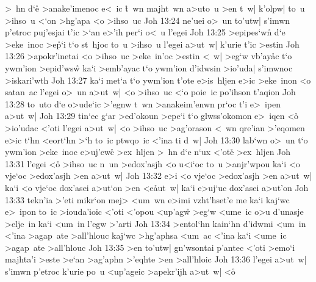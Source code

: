 >~hn
d`e\r{}
>anake'imenoc
e<~ic
\r{t}~wn
majht~wn
a>uto~u
>en
t~w|
k'olpw|
to~u
>ihso~u
<`on
>hg'apa
<o
>ihso~uc\bibvsend
\vs Joh 13:24
ne'uei
o>~un
to'utw|
s'imwn
p'etroc
puj'esjai
t'ic
>`an
e>'ih
per`i
o<~u
l'egei\bibvsend
\vs Joh 13:25
>epipes`wn\r{}
d`e
>eke~inoc
>e\r{p}`i
t`o
st~hjoc
to~u
>ihso~u
l'egei
a>ut~w|
k'urie
t'ic
>estin\bibvsend
\vs Joh 13:26
>apokr'inetai
<o
>ihso~uc
>eke~in'oc
>estin
<~w|
>eg`w
vb'ay\r{a}c
t`o
ywm'ion
>epid'wsw\r{}
ka`i
>emb'ayac
t`o
ywm'ion
d'idwsin
>io'uda|
s'imwnoc
>iskari'wth\bibvsend
\vs Joh 13:27
ka`i
met`a
t`o
ywm'ion
t'ote
e>is~hljen
e>ic
>eke~inon
<o
satan~ac
l'egei
o>~un
a>ut~w|
<o
>ihso~uc
<`o
poie~ic
po'ihson
t'aqion\bibvsend
\vs Joh 13:28
to~uto
d`e
o>ude`ic
>'egnw
t~wn
>anakeim'enwn
pr`oc
t'i
e>~ipen
a>ut~w|\bibvsend
\vs Joh 13:29
tin`ec
g`ar
>ed'okoun
>epe`i
t`o
glwss'okomon
e>~iqen
<o\r{}
>io'udac
<'oti
l'egei
a>ut~w|
<o
>ihso~uc
>ag'orason
<~wn
qre'ian
>'eqomen
e>ic
t`hn
<eort`hn
>`h
to~ic
ptwqo~ic
<'ina
ti
d~w|\bibvsend
\vs Joh 13:30
lab`wn
o>~un
t`o
ywm'ion
>eke~inoc
e>uj'ewc\r{}
>ex~hljen
>~hn
d`e
n`ux
<'ot\r{e}
>ex~hljen\bibvsend
\vs Joh 13:31
l'egei
<o\r{}
>ihso~uc
n~un
>edox'asjh
<o
u<i`oc
to~u
>anjr'wpou
ka`i
<o
vje`oc
>edox'asjh
>en
a>ut~w|\bibvsend
\vs Joh 13:32
e>i
<o
vje`oc
>edox'asjh
>en
a>ut~w|
ka`i
<o
vje`oc
dox'asei
a>ut`on
>en
<e\r{a}ut~w|
ka`i
e>uj`uc
dox'asei
a>ut'on\bibvsend
\vs Joh 13:33
tekn'ia
>'eti
mikr`on
mej>
<um~wn
e>imi
vzht'hset'e
me
ka`i
kaj`wc
e>~ipon
to~ic
>iouda'ioic
<'oti
<'opou
<up'agw\r{}
>eg`w
<ume~ic
o>u
d'unasje
>elje~in
ka`i
<um~in
l'egw
>'arti\bibvsend
\vs Joh 13:34
>entol`hn
kain`hn
d'idwmi
<um~in
<'ina
>agap~ate
>all'hlouc
kaj`wc
>hg'aphsa
<um~ac
<'ina
ka`i
<ume~ic
>agap~ate
>all'hlouc\bibvsend
\vs Joh 13:35
>en
to'utw|
gn'wsontai
p'antec
<'oti
>emo`i
majhta'i
>este
>e`an
>ag'aphn
>'eqhte
>en
>all'hloic\bibvsend
\vs Joh 13:36
l'egei
a>ut~w|
s'imwn
p'etroc
k'urie
po~u
<up'ageic
>apekr'ijh
a>ut~w|
<o\r{}
